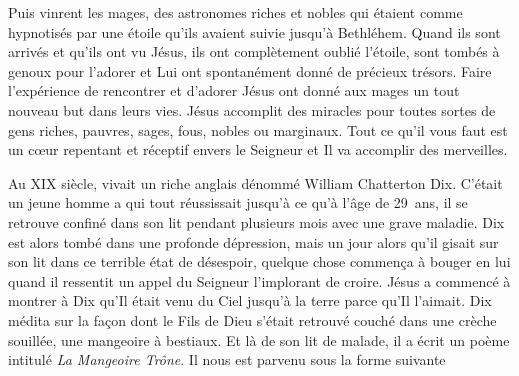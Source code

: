 Puis vinrent les mages, des astronomes riches et nobles qui étaient comme hypnotisés par une étoile qu'ils avaient suivie jusqu'à Bethléhem. Quand ils sont arrivés et qu'ils ont vu Jésus, ils ont complètement oublié l'étoile, sont tombés à genoux pour l'adorer et Lui ont spontanément donné de précieux trésors. Faire l'expérience de rencontrer et d'adorer Jésus ont donné aux mages un tout nouveau but dans leurs vies. Jésus accomplit des miracles pour toutes sortes de gens\frcolon{} riches, pauvres, sages, fous, nobles ou marginaux. Tout ce qu'il vous faut est un cœur repentant et réceptif envers le Seigneur et Il va accomplir des merveilles.

Au XIX siècle, vivait un riche anglais dénommé William Chatterton Dix. C'était un jeune homme a qui tout réussissait jusqu'à ce qu'à l'âge de 29~ans, il se retrouve confiné dans son lit pendant plusieurs mois avec une grave maladie. Dix est alors tombé dans une profonde dépression, mais un jour alors qu'il gisait sur son lit dans ce terrible état de désespoir, quelque chose commença à bouger en lui quand il ressentit un appel du Seigneur l'implorant de croire. Jésus a commencé à montrer à Dix qu'Il était venu du Ciel jusqu'à la terre parce qu'Il l'aimait. Dix médita sur la façon dont le Fils de Dieu s'était retrouvé couché dans une crèche souillée, une mangeoire à bestiaux. Et là de son lit de malade, il a écrit un poème intitulé \emph{La Mangeoire Trône}. Il nous est parvenu sous la forme suivante\frcolon{}

